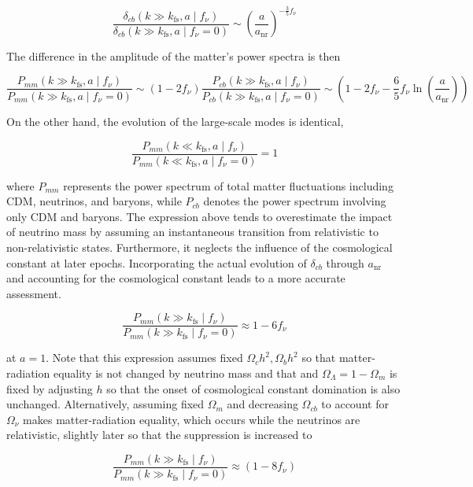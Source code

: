 \begin{equation}
    \frac{\delta_{c b}(k \gg k_{\mathrm{fs}}, a \mid f_{\nu})}{\delta_{c b}(k \gg k_{\mathrm{fs}}, a \mid f_{\nu}=0)} \sim \left(\frac{a}{a_{\mathrm{nr}}}\right)^{-\frac{3}{5} f_{\nu}} \label{n.13}
\end{equation}

The difference in the amplitude of the matter's power spectra is then

\begin{equation}
    \frac{P_{m m}(k \gg k_{\mathrm{fs}}, a \mid f_{\nu})}{P_{m m}(k \gg k_{\mathrm{fs}}, a \mid f_{\nu}=0)} \sim \left(1 - 2 f_{\nu}\right) \frac{P_{c b}(k \gg k_{\mathrm{fs}}, a \mid f_{\nu})}{P_{c b}(k \gg k_{\mathrm{fs}}, a \mid f_{\nu}=0)} \sim \left(1 - 2 f_{\nu} - \frac{6}{5} f_{\nu} \ln \left(\frac{a}{a_{\mathrm{nr}}}\right)\right) \label{n.14}
\end{equation}

On the other hand, the evolution of the large-scale modes is identical,

\begin{equation}
    \frac{P_{m m}(k \ll k_{\mathrm{fs}}, a \mid f_{\nu})}{P_{m m}(k \ll k_{\mathrm{fs}}, a \mid f_{\nu}=0)} = 1 \label{n.15}
\end{equation}

where $P_{m m}$ represents the power spectrum of total matter fluctuations including CDM, neutrinos, and baryons, while $P_{c b}$ denotes the power spectrum involving only CDM and baryons. The expression above tends to overestimate the impact of neutrino mass by assuming an instantaneous transition from relativistic to non-relativistic states. Furthermore, it neglects the influence of the cosmological constant at later epochs. Incorporating the actual evolution of $\delta_{c b}$ through $a_{\mathrm{nr}}$ and accounting for the cosmological constant leads to a more accurate assessment.


\begin{equation}
    \frac{P_{m m}(k \gg k_{\mathrm{fs}} \mid f_{\nu})}{P_{m m}(k \gg k_{\mathrm{fs}} \mid f_{\nu}=0)} \approx 1 - 6 f_{\nu} \label{n.16}
\end{equation}

at $a = 1$. Note that this expression assumes fixed $\Omega_{c} h^{2}, \Omega_{b} h^{2}$ so that matter-radiation equality is not changed by neutrino mass and that and $\Omega_{\Lambda} = 1 - \Omega_{m}$ is fixed by adjusting $h$ so that the onset of cosmological constant domination is also unchanged. Alternatively, assuming fixed $\Omega_{m}$ and decreasing $\Omega_{c b}$ to account for $\Omega_{\nu}$ makes matter-radiation equality, which occurs while the neutrinos are relativistic, slightly later so that the suppression is increased to

\begin{equation}
    \frac{P_{m m}(k \gg k_{\mathrm{fs}} \mid f_{\nu})}{P_{m m}(k \gg k_{\mathrm{fs}} \mid f_{\nu}=0)} \approx (1 - 8 f_{\nu}) \label{n.17}
\end{equation}
